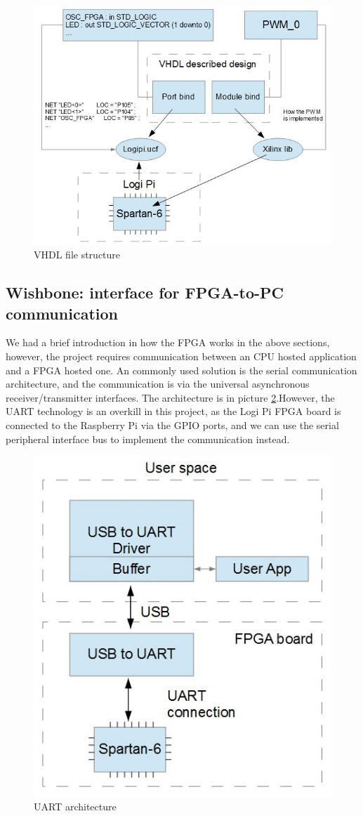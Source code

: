 \documentclass[11pt,openright,a4paper]{report}
\begin{document}
\begin{figure}
\centering
\includegraphics[width=0.7\linewidth]{picture/vhdlstruct}
\caption{VHDL file structure}
\label{fig:vhdlstruct}
\end{figure}
\subsection{Wishbone: interface for FPGA-to-PC communication}
We had a brief introduction in how the FPGA works in the above sections, however, the project requires communication between an CPU hosted application and a FPGA hosted one. An commonly used solution is the serial communication architecture, and the communication is via the universal asynchronous receiver/transmitter interfaces\cite{michael1992universal}. The architecture is in picture \ref{fig:uart}.However, the UART technology is an overkill in this project, as the Logi Pi FPGA board is connected to the Raspberry Pi via the GPIO ports, and we can use the serial peripheral interface bus to implement the communication instead.\\
\begin{figure}[H]
	\centering
	\includegraphics[width=0.5\linewidth]{picture/uart}
	\caption{UART architecture}
	\label{fig:uart}
\end{figure}
\end{document}
